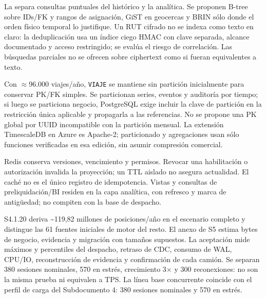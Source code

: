 La  separa consultas puntuales del histórico y la analítica. Se proponen B-tree sobre IDs/FK y rangos de asignación, GiST en geocercas y BRIN sólo donde el orden físico temporal lo justifique. Un RUT cifrado no se indexa como texto en claro: la deduplicación usa un índice ciego HMAC con clave separada, alcance documentado y acceso restringido; se evalúa el riesgo de correlación. Las búsquedas parciales no se ofrecen sobre ciphertext como si fueran equivalentes a texto.

Con $\approx$96.000 viajes/año, \texttt{VIAJE} se mantiene sin partición inicialmente para conservar PK/FK simples. Se particionan series, eventos y auditoría por tiempo; si luego se particiona negocio, PostgreSQL exige incluir la clave de partición en la restricción única aplicable y propagarla a las referencias. No se propone una PK global por UUID incompatible con la partición mensual. La extensión TimescaleDB en Azure es Apache-2; particionado y agregaciones usan sólo funciones verificadas en esa edición, sin asumir compresión comercial.

Redis conserva versiones, vencimiento y permisos. Revocar una habilitación o autorización invalida la proyección; un TTL aislado no asegura actualidad. El caché no es el único registro de idempotencia. Vistas y consultas de preliquidación/BI residen en la capa analítica, con refresco y marca de antigüedad; no compiten con la base de despacho.

S4.1.20 deriva \textasciitilde{}119,82 millones de posiciones/año en el escenario completo y distingue las 61 fuentes iniciales de motor del resto. El anexo de S5 estima bytes de negocio, evidencia y migración con tamaños supuestos. La aceptación mide máximos y percentiles del despacho, retraso de CDC, consumo de WAL, CPU/IO, reconstrucción de evidencia y confirmación de cada camión. Se separan 380 sesiones nominales, 570 en estrés, crecimiento 3$\times$ y 300 reconexiones: no son la misma prueba ni equivalen a TPS. La línea base concurrente coincide con el perfil de carga del Subdocumento 4: 380 sesiones nominales y 570 en estrés.
